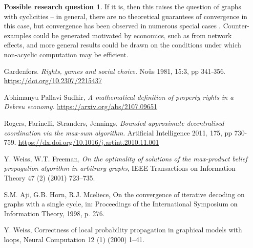 \documentclass{article}
\theoremstyle{definition}
\newtheorem{question}{Possible research question}
\begin{document}
\begin{question}
    If it is, then this raises the question of graphs with cyclicities -- in general, there are no theoretical guarantees of convergence in this case, but convergence has been observed in numerous special cases \cite{weiss, aji, weiss2}. Counter-examples could be generated motivated by economics, such as from network effects, and more general results could be drawn on the conditions under which non-acyclic computation may be efficient.
    \label{q:cycle}
\end{question}

\begin{thebibliography}{19}

Gardenfors. \emph{Rights, games and social choice.} No\^us 1981, 15:3, pp 341-356.
\url{https://doi.org/10.2307/2215437}

Abhimanyu Pallavi Sudhir, \emph{A mathematical definition of property rights in a Debreu economy.} \url{https://arxiv.org/abs/2107.09651}

Rogers, Farinelli, Stranders, Jennings, \emph{Bounded approximate decentralised coordination via the max-sum algorithm.} Artificial Intelligence 2011, 175, pp 730-759. 
\url{https://dx.doi.org/10.1016/j.artint.2010.11.001}

Y. Weiss, W.T. Freeman, \emph{On the optimality of solutions of the max-product belief propagation algorithm in arbitrary graphs}, IEEE Transactions on
Information Theory 47 (2) (2001) 723–735.

 S.M. Aji, G.B. Horn, R.J. Mceliece, On the convergence of iterative decoding on graphs with a single cycle, in: Proceedings of the International Symposium on Information Theory, 1998, p. 276.
 
 Y. Weiss, Correctness of local probability propagation in graphical models with loops, Neural Computation 12 (1) (2000) 1–41.

\end{thebibliography}
\end{document}
